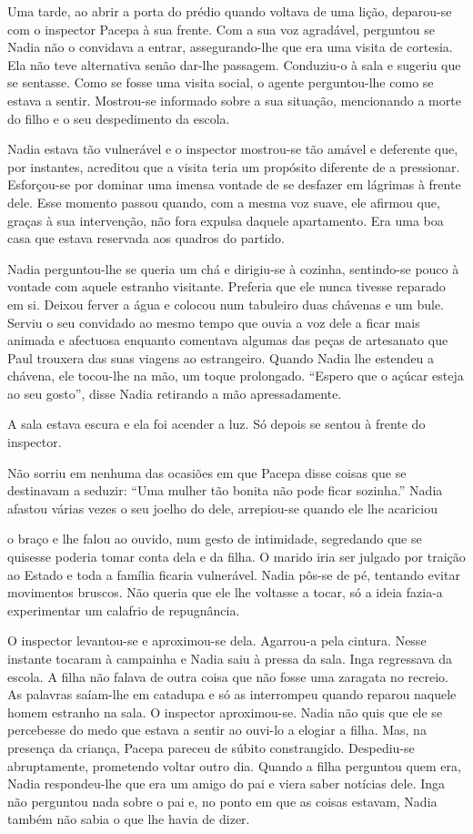Uma tarde, ao abrir a porta do prédio quando voltava de uma lição,
deparou-se com o inspector Pacepa à sua frente. Com a sua voz agradável,
perguntou se Nadia não o convidava a entrar, assegurando-lhe que era uma
visita de cortesia. Ela não teve alternativa senão dar-lhe passagem.
Conduziu-o à sala e sugeriu que se sentasse. Como se fosse uma visita
social, o agente perguntou-lhe como se estava a sentir. Mostrou-se
informado sobre a sua situação, mencionando a morte do filho e o seu
despedimento da escola.

Nadia estava tão vulnerável e o inspector mostrou-se tão amável e
deferente que, por instantes, acreditou que a visita teria um propósito
diferente de a pressionar. Esforçou-se por dominar uma imensa vontade de
se desfazer em lágrimas à frente dele. Esse momento passou quando, com
a mesma voz suave, ele afirmou que, graças à sua intervenção, não fora
expulsa daquele apartamento. Era uma boa casa que estava reservada aos
quadros do partido.

Nadia perguntou-lhe se queria um chá e dirigiu-se à cozinha, sentindo-se
pouco à vontade com aquele estranho visitante. Preferia que ele nunca
tivesse reparado em si. Deixou ferver a água e colocou num tabuleiro
duas chávenas e um bule. Serviu o seu convidado ao mesmo tempo que
ouvia a voz dele a ficar mais animada e afectuosa enquanto comentava
algumas das peças de artesanato que Paul trouxera das suas viagens ao
estrangeiro. Quando Nadia lhe estendeu a chávena, ele tocou-lhe na mão,
um toque prolongado. ``Espero que o açúcar esteja ao seu gosto'', disse
Nadia retirando a mão apressadamente.

A sala estava escura e ela foi acender a luz. Só depois se sentou à
frente do inspector.

Não sorriu em nenhuma das ocasiões em que Pacepa disse coisas que se
destinavam a seduzir: ``Uma mulher tão bonita não pode ficar sozinha.''
Nadia afastou várias vezes o seu joelho do dele, arrepiou-se quando ele
lhe acariciou

o braço e lhe falou ao ouvido, num gesto de intimidade, segredando que
se quisesse poderia tomar conta dela e da filha. O marido iria ser
julgado por traição ao Estado e toda a família ficaria vulnerável. Nadia
pôs-se de pé, tentando evitar movimentos bruscos. Não queria que ele
lhe voltasse a tocar, só a ideia fazia-a experimentar um calafrio de
repugnância.

O inspector levantou-se e aproximou-se dela. Agarrou-a pela cintura.
Nesse instante tocaram à campainha e Nadia saiu à pressa da sala. Inga
regressava da escola. A filha não falava de outra coisa que não fosse
uma zaragata no recreio. As palavras saíam-lhe em catadupa e só as
interrompeu quando reparou naquele homem estranho na sala. O inspector
aproximou-se. Nadia não quis que ele se percebesse do medo que estava a
sentir ao ouvi-lo a elogiar a filha. Mas, na presença da criança, Pacepa
pareceu de súbito constrangido. Despediu-se abruptamente, prometendo
voltar outro dia. Quando a filha perguntou quem era, Nadia respondeu-lhe
que era um amigo do pai e viera saber notícias dele. Inga não perguntou
nada sobre o pai e, no ponto em que as coisas estavam, Nadia também não
sabia o que lhe havia de dizer.


